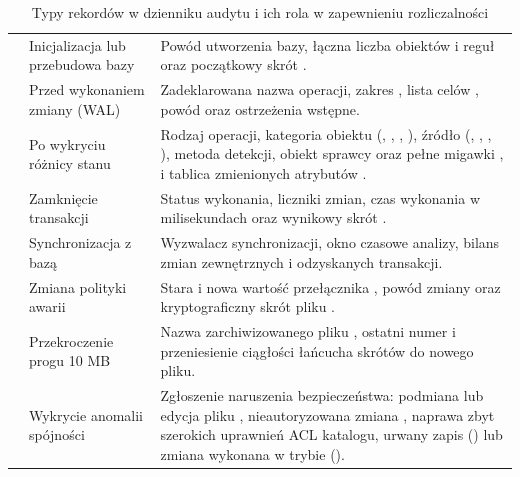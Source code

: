 \begin{table}[H]
    \centering
    \caption{Typy rekordów w dzienniku audytu  i ich rola w zapewnieniu rozliczalności}\label{tab:typy-rekordow-audytu}
    \tablefont
    \begin{tabularx}{\linewidth}{L{2.2cm} L{3.6cm} Y}
        \toprule
         &  &  \\
        \midrule
         & Inicjalizacja lub przebudowa bazy & Powód utworzenia bazy, łączna liczba obiektów i reguł oraz początkowy skrót . \\
         & Przed wykonaniem zmiany (WAL) & Zadeklarowana nazwa operacji, zakres , lista celów , powód  oraz ostrzeżenia wstępne. \\
         & Po wykryciu różnicy stanu & Rodzaj operacji, kategoria obiektu (, , , ), źródło (, , , ), metoda detekcji, obiekt sprawcy  oraz pełne migawki ,  i tablica zmienionych atrybutów . \\
         & Zamknięcie transakcji & Status wykonania, liczniki zmian, czas wykonania w milisekundach oraz wynikowy skrót . \\
         & Synchronizacja z bazą & Wyzwalacz synchronizacji, okno czasowe analizy, bilans zmian zewnętrznych i odzyskanych transakcji. \\
         & Zmiana polityki awarii & Stara i nowa wartość przełącznika , powód zmiany oraz kryptograficzny skrót pliku . \\
         & Przekroczenie progu 10 MB & Nazwa zarchiwizowanego pliku , ostatni numer  i przeniesienie ciągłości łańcucha skrótów do nowego pliku. \\
         & Wykrycie anomalii spójności & Zgłoszenie naruszenia bezpieczeństwa: podmiana lub edycja pliku , nieautoryzowana zmiana , naprawa zbyt szerokich uprawnień ACL katalogu, urwany zapis () lub zmiana wykonana w trybie  (). \\
        \bottomrule
    \end{tabularx}
\end{table}

